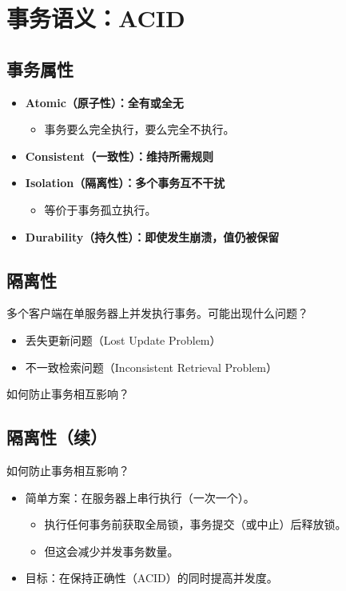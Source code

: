 \section{事务语义：ACID}

\subsection{事务属性}

\begin{itemize}
  \item \textbf{Atomic（原子性）：全有或全无}
  \begin{itemize}
    \item 事务要么完全执行，要么完全不执行。
  \end{itemize}
  \item \textbf{Consistent（一致性）：维持所需规则}
  \item \textbf{Isolation（隔离性）：多个事务互不干扰}
  \begin{itemize}
    \item 等价于事务孤立执行。
  \end{itemize}
  \item \textbf{Durability（持久性）：即使发生崩溃，值仍被保留}
\end{itemize}

\subsection{隔离性}

多个客户端在单服务器上并发执行事务。可能出现什么问题？

\begin{itemize}
  \item 丢失更新问题（Lost Update Problem）
  \item 不一致检索问题（Inconsistent Retrieval Problem）
\end{itemize}

如何防止事务相互影响？

\subsection{隔离性（续）}

如何防止事务相互影响？

\begin{itemize}
  \item 简单方案：在服务器上串行执行（一次一个）。
  \begin{itemize}
    \item 执行任何事务前获取全局锁，事务提交（或中止）后释放锁。
    \item 但这会减少并发事务数量。
  \end{itemize}
  \item 目标：在保持正确性（ACID）的同时提高并发度。
\end{itemize}

